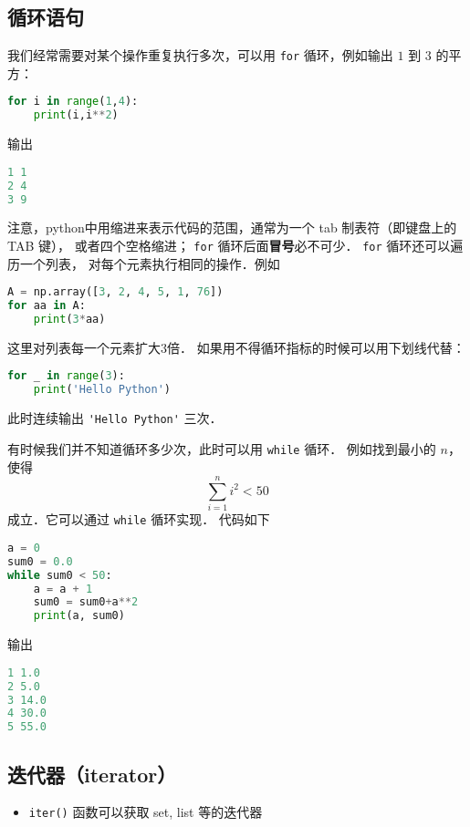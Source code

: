 \subsection{循环语句}
我们经常需要对某个操作重复执行多次，可以用 \verb|for| 循环，例如输出 $1$ 到 $3$ 的平方：
\begin{lstlisting}[language=python]
for i in range(1,4):
    print(i,i**2)
\end{lstlisting}
输出
\begin{lstlisting}[language=python]
1 1
2 4
3 9
\end{lstlisting}
注意，python中用缩进来表示代码的范围，通常为一个 tab 制表符（即键盘上的 TAB 键）， 或者四个空格缩进； \verb|for| 循环后面\textbf{冒号}必不可少． \verb|for| 循环还可以遍历一个列表， 对每个元素执行相同的操作．例如
\begin{lstlisting}[language=python]
A = np.array([3, 2, 4, 5, 1, 76])
for aa in A:
    print(3*aa)
\end{lstlisting}
这里对列表每一个元素扩大3倍． 如果用不得循环指标的时候可以用下划线代替：
\begin{lstlisting}[language=python]
for _ in range(3):
    print('Hello Python')
\end{lstlisting}
此时连续输出   \verb|'Hello Python'|  三次．

有时候我们并不知道循环多少次，此时可以用 \verb|while| 循环． 例如找到最小的 $n$，使得
\begin{equation}
\sum_{i=1}^n i^2<50
\end{equation}
成立．它可以通过 \verb|while| 循环实现． 代码如下
\begin{lstlisting}[language=python]
a = 0
sum0 = 0.0
while sum0 < 50:
    a = a + 1
    sum0 = sum0+a**2
    print(a, sum0)
\end{lstlisting}
输出
\begin{lstlisting}[language=python]
1 1.0
2 5.0
3 14.0
4 30.0
5 55.0
\end{lstlisting}

\subsection{迭代器（iterator）}
\begin{itemize}
\item \verb|iter()| 函数可以获取 set, list 等的迭代器
\end{itemize}

